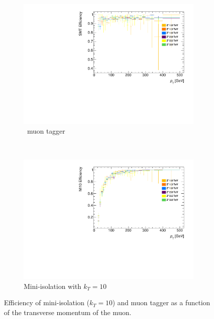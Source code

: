 \begin{figure}[t]
\begin{subfigure}{0.49\linewidth}\tabularnewline
  \centering
  \includegraphics[width=\textwidth]{PartBoosted/Plots/he_staco_smt_pt.pdf}
  \caption{\xsm\ muon tagger} \label{fig:BoostedSMTeffVsPt}
\end{subfigure}
~
\begin{subfigure}{0.49\linewidth}
  \centering
  \includegraphics[width=\textwidth]{PartBoosted/Plots/he_muid_mi10_pt.pdf}
  \caption{Mini-isolation with $k_{T}=10$} \label{fig:BoostedMIeffVsPt}
\end{subfigure}

\caption{Efficiency of mini-isolation ($k_{T}=10$) and \xsm muon tagger as a function of the transverse momentum of the muon.} \label{fig:BoostedEfficiencyVsPt}
\end{figure}


